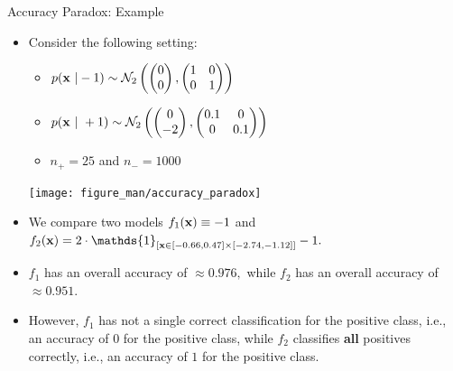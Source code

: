 \documentclass[11pt,compress,t,notes=noshow, xcolor=table]{beamer}
\begin{document}
\begin{vbframe}{Accuracy Paradox: Example}
%
	\footnotesize
	\begin{itemize}
		\item Consider the following setting:
%		

		\begin{minipage}{0.55\textwidth}    
%			
		\begin{itemize}
			\scriptsize
%			
			\item $p(\mathbf{x} ~| -1) \sim \mathcal{N}_2\left( 
			\begin{pmatrix}
				0 \\ 0
			\end{pmatrix}  , 
			\begin{pmatrix}
			1  & 0 \\ 0 & 1
			\end{pmatrix}   \right) $
%		 
			\item  $p(\mathbf{x} ~| ~ +1) \sim \mathcal{N}_2\left( 
			\begin{pmatrix}
				0 \\ -2
			\end{pmatrix}  , 
			\begin{pmatrix}
				0.1  & 0 \\ 0 & 0.1
			\end{pmatrix}   \right)  $
%		
			\item $n_+ = 25$ and $n_- = 1000$
%		
		\end{itemize}
		\end{minipage}
		\begin{minipage}{0.35\textwidth}    
		\begin{center}
			\texttt{[image: figure\_man/accuracy\_paradox]}
		\end{center}
		\end{minipage}
%	
	\item We compare two models $f_1(\mathbf{x}) \equiv -1$ and $f_2(\xv) = 2 \cdot \mathds{1}_{[ \xv \in [-0.66,0.47]\times [-2.74,-1.12] ]} -1.$
%	
	\item $f_1$ has an overall accuracy of $\approx 0.976,$ while $f_2$ has an overall accuracy of $\approx 0.951.$
%	
	\item However, $f_1$ has not a single correct classification for the positive class, i.e., an accuracy of $0$ for the positive class, while $f_2$ classifies \textbf{all} positives correctly, i.e., an accuracy of $1$ for the positive class.
%	
	\end{itemize}
\end{vbframe} 
\end{document}
